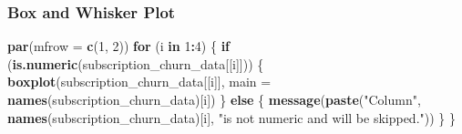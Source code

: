 \documentclass[
]{article}
\newenvironment{Shaded}{\begin{snugshade}}{\end{snugshade}}
\newcommand{\AttributeTok}[1]{\textcolor[rgb]{0.13,0.29,0.53}{#1}}
\newcommand{\ControlFlowTok}[1]{\textcolor[rgb]{0.13,0.29,0.53}{\textbf{#1}}}
\newcommand{\DecValTok}[1]{\textcolor[rgb]{0.00,0.00,0.81}{#1}}
\newcommand{\FunctionTok}[1]{\textcolor[rgb]{0.13,0.29,0.53}{\textbf{#1}}}
\newcommand{\NormalTok}[1]{#1}
\newcommand{\SpecialCharTok}[1]{\textcolor[rgb]{0.81,0.36,0.00}{\textbf{#1}}}
\newcommand{\StringTok}[1]{\textcolor[rgb]{0.31,0.60,0.02}{#1}}
\begin{document}
\subsubsection{Box and Whisker Plot}\label{box-and-whisker-plot}

\begin{Shaded}
\begin{Highlighting}[]
\FunctionTok{par}\NormalTok{(}\AttributeTok{mfrow =} \FunctionTok{c}\NormalTok{(}\DecValTok{1}\NormalTok{, }\DecValTok{2}\NormalTok{))}
\ControlFlowTok{for}\NormalTok{ (i }\ControlFlowTok{in} \DecValTok{1}\SpecialCharTok{:}\DecValTok{4}\NormalTok{) \{}
  \ControlFlowTok{if}\NormalTok{ (}\FunctionTok{is.numeric}\NormalTok{(subscription\_churn\_data[[i]])) \{}
    \FunctionTok{boxplot}\NormalTok{(subscription\_churn\_data[[i]], }\AttributeTok{main =} \FunctionTok{names}\NormalTok{(subscription\_churn\_data)[i])}
\NormalTok{  \} }\ControlFlowTok{else}\NormalTok{ \{}
    \FunctionTok{message}\NormalTok{(}\FunctionTok{paste}\NormalTok{(}\StringTok{"Column"}\NormalTok{, }\FunctionTok{names}\NormalTok{(subscription\_churn\_data)[i],}
                  \StringTok{"is not numeric and will be skipped."}\NormalTok{))}
\NormalTok{  \}}
\NormalTok{\}}
\end{Highlighting}
\end{Shaded}
\end{document}
